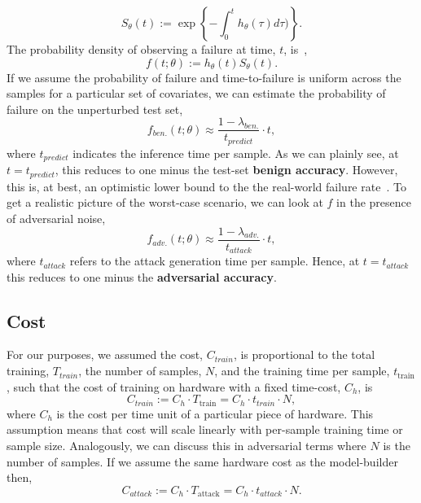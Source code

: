 \begin{equation}
    S_{\theta}(t) := \exp \left\{- \int_0^{t} h_{\theta}(\tau) d\tau) \right\}.
\label{eq:cdf}
\end{equation}
The probability density of observing a failure at time, $t$, is~\cite{kleinbaum1996survival},
\begin{equation*}
    f(t; \theta) := h_{\theta}(t)S_{\theta}(t).
    \label{eq:pdf}
\end{equation*}
If we assume the probability of failure and time-to-failure is uniform across the samples for a particular set of covariates, we can estimate the probability of failure on the unperturbed test set,
\begin{equation}
    f_{ben.}(t; \theta) \approx \frac{1 - \lambda_{ben.}}{t_{predict}} \cdot t,
    \label{eq:ben_failure_rate}
\end{equation}
where $t_{predict}$ indicates the inference time per sample. As we can plainly see, at $t=t_{predict}$, this reduces to one minus the test-set \textbf{benign accuracy}. However, this is, at best, an optimistic lower bound to the the real-world failure rate~\cite{meyers,croce_reliable_2020}. To get a realistic picture of the worst-case scenario, we can look at $f$ in the presence of adversarial noise,
\begin{equation}
    f_{adv.}(t; \theta) \approx \frac{ 1 - \lambda_{adv.}}{t_{attack}} \cdot t,
    \label{eq:adv_failure_rate}
\end{equation}
where $t_{attack}$ refers to the attack generation time per sample. Hence, at $t=t_{attack}$ this reduces to one minus the \textbf{adversarial accuracy}.


\subsection{Cost}

\label{cost}
For our purposes, we assumed the cost, $C_{train}$, is proportional to the total training, $T_{train}$, the number of samples, $N$,  and the training time per sample, $t_{\mathrm{train}}$, such that the cost of training on hardware with a fixed time-cost, $C_h$, is
\[
    C_{train} := C_{h} \cdot T_{\mathrm{train}} = C_h \cdot t_{train} \cdot N,
\]
where $C_h$ is the cost per time unit of a particular piece of hardware. This assumption means that cost will scale linearly with per-sample training time or sample size. Analogously, we can discuss this in adversarial terms where $N$ is the number of samples. If we assume the same hardware cost as the model-builder then,
$$
    C_{attack} := C_{h} \cdot T_{\mathrm{attack}} = C_h \cdot t_{attack} \cdot N.
$$

